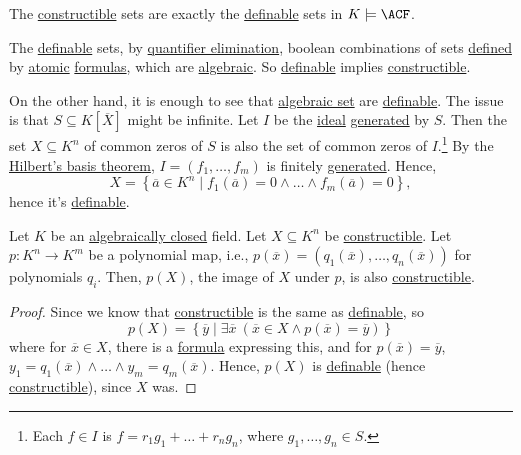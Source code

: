 \begin{remark}
	The \hyperref[def:constructible]{constructible} sets are exactly the \hyperref[def:definable]{definable} sets in \(K \models \ACF\).
\end{remark}
\begin{explanation}
	The \hyperref[def:definable]{definable} sets, by \hyperref[def:quantifier-elimination]{quantifier elimination}, boolean combinations of sets \hyperref[def:definable]{defined} by \hyperref[not:atomic]{atomic} \hyperref[def:formula]{formulas}, which are \hyperref[def:algebraic-set]{algebraic}. So \hyperref[def:definable]{definable} implies \hyperref[def:constructible]{constructible}.

	On the other hand, it is enough to see that \hyperref[def:algebraic-set]{algebraic set} are \hyperref[def:definable]{definable}. The issue is that \(S \subseteq K[\overline{X} ]\) might be infinite. Let \(I\) be the \hyperref[def:ideal]{ideal} \hyperref[def:ideal-generation]{generated} by \(S\). Then the set \(X \subseteq K^n\) of common zeros of \(S\) is also the set of common zeros of \(I\).\footnote{Each \(f\in I\) is \(f = r_1 g_1 + \ldots + r_n g_n\), where \(g_1, \ldots , g_n \in S\).} By the \hyperref[thm:Hilbert-basis]{Hilbert's basis theorem}, \(I = (f_1, \ldots , f_m)\) is finitely \hyperref[def:ideal-generation]{generated}. Hence,
	\[
		X = \left\{ \overline{a} \in K^n \mid f_1(\overline{a} ) = 0 \land \ldots \land f_{m}(\overline{a} ) = 0  \right\},
	\]
	hence it's \hyperref[def:definable]{definable}.
\end{explanation}

\begin{theorem}\label{def:Chevalley}
	Let \(K\) be an \hyperref[def:algebraically-closed]{algebraically closed} field. Let \(X \subseteq K^n\) be \hyperref[def:constructible]{constructible}. Let \(p \colon K^n \to K^m\) be a polynomial map, i.e., \(p(\overline{x} ) = (q_1(\overline{x} ), \ldots , q_n(\overline{x} ))\) for polynomials \(q_i\). Then, \(p(X)\), the image of \(X\) under \(p\), is also \hyperref[def:constructible]{constructible}.
\end{theorem}
\begin{proof}
	Since we know that \hyperref[def:constructible]{constructible} is the same as \hyperref[def:definable]{definable}, so
	\[
		p(X) = \left\{ \overline{y} \mid \exists \overline{x} \ (\overline{x} \in X \land p(\overline{x} ) = \overline{y} ) \right\}
	\]
	where for \(\overline{x} \in X\), there is a \hyperref[def:formula]{formula} expressing this, and for \(p(\overline{x} ) = \overline{y} \), \(y_1 = q_1(\overline{x} ) \land \ldots \land y_m=q_m(\overline{x} )\). Hence, \(p(X)\) is \hyperref[def:definable]{definable} (hence \hyperref[def:constructible]{constructible}), since \(X\) was.
\end{proof}


